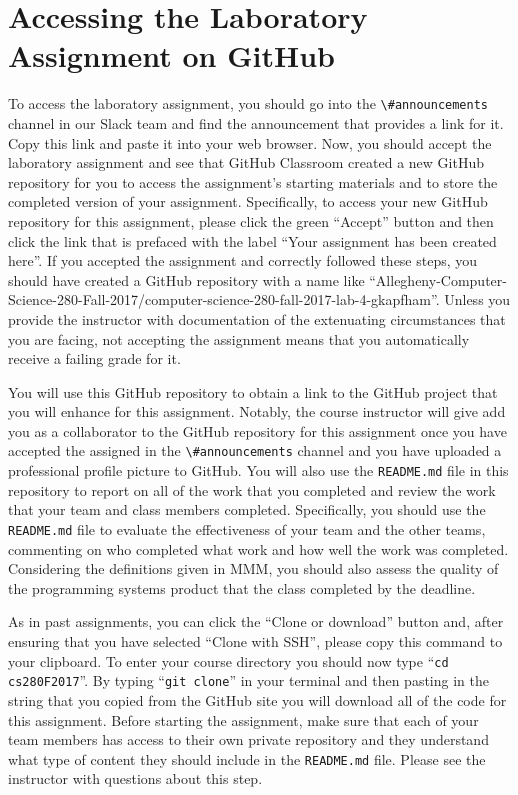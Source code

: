 \documentclass[11pt]{article}
\newcommand{\reflection}{\lstinline{README.md}}
\newcommand{\command}[1]{``\lstinline{#1}''}
\newcommand{\channel}[1]{\lstinline{#1}}
\begin{document}
\section*{Accessing the Laboratory Assignment on GitHub}

To access the laboratory assignment, you should go into the \channel{\#announcements} channel in our Slack team and find
the announcement that provides a link for it. Copy this link and paste it into your web browser. Now, you should accept
the laboratory assignment and see that GitHub Classroom created a new GitHub repository for you to access the
assignment's starting materials and to store the completed version of your assignment. Specifically, to access your new
GitHub repository for this assignment, please click the green ``Accept'' button and then click the link that is prefaced
with the label ``Your assignment has been created here''. If you accepted the assignment and correctly followed these
steps, you should have created a GitHub repository with a name like
``Allegheny-Computer-Science-280-Fall-2017/computer-science-280-fall-2017-lab-4-gkapfham''. Unless you provide the
instructor with documentation of the extenuating circumstances that you are facing, not accepting the assignment means
that you automatically receive a failing grade for it.

You will use this GitHub repository to obtain a link to the GitHub project that you will enhance for this assignment.
Notably, the course instructor will give add you as a collaborator to the GitHub repository for this assignment once you
have accepted the assigned in the \channel{\#announcements} channel and you have uploaded a professional profile picture
to GitHub. You will also use the \reflection{} file in this repository to report on all of the work that you completed
and review the work that your team and class members completed. Specifically, you should use the \reflection{} file to
evaluate the effectiveness of your team and the other teams, commenting on who completed what work and how well the work
was completed. Considering the definitions given in MMM, you should also assess the quality of the programming systems
product that the class completed by the deadline.

As in past assignments, you can click the ``Clone or download'' button and, after ensuring that you have selected
``Clone with SSH'', please copy this command to your clipboard. To enter your course directory you should now type
\command{cd cs280F2017}. By typing \command{git clone} in your terminal and then pasting in the string that you copied
from the GitHub site you will download all of the code for this assignment. Before starting the assignment, make sure
that each of your team members has access to their own private repository and they understand what type of content they
should include in the \reflection{} file. Please see the instructor with questions about this step.
\end{document}
